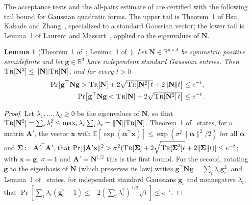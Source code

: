 \documentclass[11pt]{article}
\newtheorem{lemma}[theorem]{Lemma}
\theoremstyle{remark}
\renewcommand{\AA}{\mathbf A}
\renewcommand{\gg}{{\mathbf g}}
\newcommand{\NN}{\mathbf N}
\newcommand{\xx}{\mathbf x}
\newcommand{\R}{\mathbb R}
\newcommand{\defeq}{\coloneqq}
\newcommand{\Ex}{\mathbb E}
\newcommand{\norm}[1]{\lVert#1\rVert}
\newcommand{\tr}{\textsc{Tr}}
\begin{document}
The acceptance tests and the all-pairs estimate of  are
certified with the following tail bound for Gaussian quadratic forms.
The upper tail is Theorem~1 of Hsu, Kakade and Zhang~\cite{HKZ12:journal},
specialized to a standard Gaussian vector; the lower tail is Lemma~1 of
Laurent and Massart~\cite{LM00:journal}, applied to the eigenvalues of
$\NN$.
\begin{lemma}[Theorem~1 of~\cite{HKZ12:journal}; Lemma~1 of~\cite{LM00:journal}]
\label{lem:quadtail}
Let $\NN\in\R^{d\times d}$ be symmetric positive semidefinite and let
$\gg\in\R^{d}$ have independent standard Gaussian entries.
Then $\tr[\NN^{2}]\le\norm{\NN}\tr[\NN]$, and for every $t>0$
\begin{align*}
\Pr\bigl[\gg^{\top}\NN\gg>\tr[\NN]+2\sqrt{\tr[\NN^{2}]\,t}+2\norm{\NN}t\bigr]
&\le e^{-t},\\
\Pr\bigl[\gg^{\top}\NN\gg<\tr[\NN]-2\sqrt{\tr[\NN^{2}]\,t}\bigr]
&\le e^{-t}.
\end{align*}
\end{lemma}
\begin{proof}
Let $\lambda_1,\dots,\lambda_d\ge0$ be the eigenvalues of $\NN$, so that
$\tr[\NN^{2}]=\sum_i\lambda_i^{2}\le\max_i\lambda_i\sum_i\lambda_i=\norm{\NN}\tr[\NN]$.
Theorem~1 of~\cite{HKZ12:journal} states, for a matrix $\AA'$, the vector
$\xx$ with $\Ex[\exp(\boldsymbol\alpha^{\top}\xx)]\le\exp(\sigma^{2}\norm{\boldsymbol\alpha}^{2}/2)$
for all $\boldsymbol\alpha$ and $\boldsymbol\Sigma\defeq\AA'^{\top}\AA'$, that
$\Pr[\norm{\AA'\xx}^{2}>\sigma^{2}(\tr[\boldsymbol\Sigma]+2\sqrt{\tr[\boldsymbol\Sigma^{2}]t}+2\norm{\boldsymbol\Sigma}t)]\le e^{-t}$;
with $\xx=\gg$, $\sigma=1$ and $\AA'=\NN^{1/2}$ this is the first bound.
For the second, rotating $\gg$ to the eigenbasis of $\NN$ (which preserves
its law) writes $\gg^{\top}\NN\gg=\sum_i\lambda_i\gg_i^{2}$, and Lemma~1
of~\cite{LM00:journal} states, for independent standard Gaussians $\gg_i$
and nonnegative $\lambda_i$, that
$\Pr[\sum_i\lambda_i(\gg_i^{2}-1)\le-2(\sum_i\lambda_i^{2})^{1/2}\sqrt t]\le e^{-t}$.
\end{proof}
\end{document}

